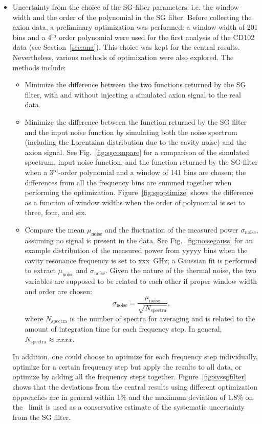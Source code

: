 \begin{itemize}
\item Uncertainty from the choice of the SG-filter parameters: i.e.  
the window width and the order of the polynomial in the SG filter. Before 
collecting the axion data, a preliminary optimization was performed: a 
window width of 201 bins and a 4$^\text{th}$ order polynomial were used for 
the first analysis of the CD102 data (see Section~\ref{sec:ana}). 
This choice was kept for the central results. 
Nevertheless, various methods of optimization were also explored. The 
methods include:
\begin{itemize}
 \item Minimize the difference between the two functions returned by the SG 
filter, with and without injecting a simulated axion signal to the real data.
 \item Minimize the difference between the function returned by the 
 SG filter and the input noise function by simulating both the noise 
spectrum (including the Lorentzian distribution due to the cavity noise) 
and the axion signal. See Fig.~\ref{fig:sgcompare} for a comparison of 
 the simulated spectrum, input noise function, and the function returned by 
 the SG-filter when a 3$^\text{rd}$-order polynomial and a window of 141 
 bins are chosen; the differences from all the frequency bins are summed 
 together when performing the optimization.
 Figure~\ref{fig:sgoptimize} shows the difference 
as a function of window widths when the order of polynomial is 
 set to three, four, and six. 
 \item Compare the mean $\mu_\text{noise}$ and the fluctuation of the 
measured power $\sigma_\text{noise}$, assuming no signal is present in the 
data. See Fig.~\ref{fig:noisegauss} for an example distribution 
of the measured power from yyyyy bins when the cavity resonance frequency 
is set to xxx~GHz; a Gaussian fit is performed to extract $\mu_\text{noise}$ 
and $\sigma_\text{noise}$. Given the nature of the 
thermal noise, the two variables are supposed to be related to 
each other if proper window width and order are chosen:
\begin{equation*} 
\sigma_\text{noise} = \frac{\mu_\text{noise}}{\sqrt{N_\text{spectra}}},
\end{equation*}
where $N_\text{spectra}$ is the number of spectra for averaging and 
is related to the amount of integration time for each frequency step. In 
general, $N_\text{spectra}\approx xxxx$. 
\end{itemize}

In addition, one could choose to optimize for each frequency step 
individually, optimize for a certain frequency step but apply the results to 
all data, or optimize by adding all the frequency steps together. 
Figure~\ref{fig:syssgfilter} shows that 
the deviations from the central results using different optimization 
approaches are in general within 1\% and the 
maximum deviation of 1.8\% 
on the \gagg\ limit is used as a conservative estimate of the systematic 
uncertainty from the SG filter. 

\end{itemize}

